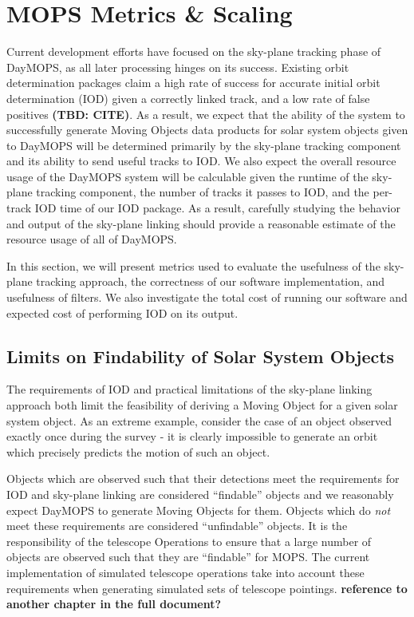 \documentclass[12pt,preprint]{aastex}
\begin{document}
\section{MOPS Metrics \& Scaling}

Current development efforts have focused on the sky-plane tracking
phase of DayMOPS, as all later processing hinges on its
success. Existing orbit determination packages claim a high rate of
success for accurate initial orbit determination (IOD) given a
correctly linked track, and a low rate of false positives
\textbf{(TBD: CITE)}. As a result, we expect that the ability of the
system to successfully generate Moving Objects data products for solar
system objects given to DayMOPS will be determined primarily by the
sky-plane tracking component and its ability to send useful tracks to
IOD.  We also expect the overall resource usage of the DayMOPS system
will be calculable given the runtime of the sky-plane tracking
component, the number of tracks it passes to IOD, and the per-track
IOD time of our IOD package.  As a result, carefully studying the
behavior and output of the sky-plane linking should provide a
reasonable estimate of the resource usage of all of DayMOPS.


In this section, we will present metrics used to evaluate the
usefulness of the sky-plane tracking approach, the correctness of our
software implementation, and usefulness of filters. We also
investigate the total cost of running our software and expected cost
of performing IOD on its output.


\subsection{Limits on Findability of Solar System Objects}

The requirements of IOD and practical limitations of the sky-plane
linking approach both limit the feasibility of deriving a Moving
Object for a given solar system object.  As an extreme example,
consider the case of an object observed exactly once during the survey
- it is clearly impossible to generate an orbit which precisely
predicts the motion of such an object.

Objects which are observed such that their detections meet the
requirements for IOD and sky-plane linking are considered ``findable''
objects and we reasonably expect DayMOPS to generate Moving Objects
for them.  Objects which do \textit{not} meet these requirements are
considered ``unfindable'' objects.  It is the responsibility of the
telescope Operations to ensure that a large number of objects are
observed such that they are ``findable'' for MOPS.  The current
implementation of simulated telescope operations take into account
these requirements when generating simulated sets of telescope
pointings. \textbf{reference to another chapter in the full document?}
\end{document}
